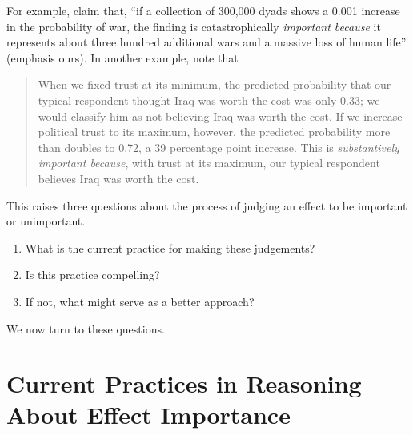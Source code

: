 \documentclass[12pt]{article}
\begin{document}
For example, \citet[p. 711]{KingZeng2001} claim that, ``if a collection of 300,000 dyads shows a 0.001 increase in the probability of war, the finding is catastrophically \emph{important because} it represents about three hundred additional wars and a massive loss of human life'' (emphasis ours). In another example, \citet[p. 317]{HetheringtonSuhay2011} note that 
\begin{quote}
When we fixed trust at its minimum, the predicted probability that our typical respondent thought Iraq was worth the cost was only 0.33; we would classify him as not believing Iraq was worth the cost. If we increase political trust to its maximum, however, the predicted probability more than doubles to 0.72, a 39 percentage point increase. This is \emph{substantively important because}, with trust at its maximum, our typical respondent believes Iraq was worth the cost.
\end{quote}
This raises three questions about the process of judging an effect to be important or unimportant.
\begin{enumerate}
\item What is the current practice for making these judgements?
\item Is this practice compelling?
\item If not, what might serve as a better approach?
\end{enumerate}
\noindent We now turn to these questions.

\section*{Current Practices in Reasoning About Effect Importance}



\end{document}
